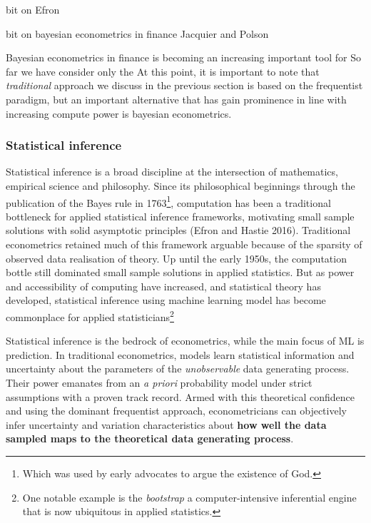 \documentclass{article}
\begin{document}
bit on Efron

bit on bayesian econometrics in finance Jacquier and Polson

Bayesian econometrics in finance is becoming an increasing important
tool for So far we have consider only the At this point, it is important
to note that \emph{traditional} approach we discuss in the previous
section is based on the frequentist paradigm, but an important
alternative that has gain prominence in line with increasing compute
power is bayesian econometrics.

\hypertarget{statistical-inference}{%
\subsubsection{Statistical inference}\label{statistical-inference}}

Statistical inference is a broad discipline at the intersection of
mathematics, empirical science and philosophy. Since its philosophical
beginnings through the publication of the Bayes rule in 1763\footnote{Which
  was used by early advocates to argue the existence of God.},
computation has been a traditional bottleneck for applied statistical
inference frameworks, motivating small sample solutions with solid
asymptotic principles (Efron and Hastie 2016). Traditional econometrics
retained much of this framework arguable because of the sparsity of
observed data realisation of theory. Up until the early 1950s, the
computation bottle still dominated small sample solutions in applied
statistics. But as power and accessibility of computing have increased,
and statistical theory has developed, statistical inference using
machine learning model has become commonplace for applied
statisticians\footnote{One notable example is the \emph{bootstrap} a
  computer-intensive inferential engine that is now ubiquitous in
  applied statistics.}

Statistical inference is the bedrock of econometrics, while the main
focus of ML is prediction. In traditional econometrics, models learn
statistical information and uncertainty about the parameters of the
\emph{unobservable} data generating process. Their power emanates from
an \emph{a priori} probability model under strict assumptions with a
proven track record. Armed with this theoretical confidence and using
the dominant frequentist approach, econometricians can objectively infer
uncertainty and variation characteristics about \textbf{how well the
data sampled maps to the theoretical data generating process}.
\end{document}

